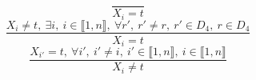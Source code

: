$$\frac{}{X_{i}=t}$$ $$\frac{X_{i} \neq t,~\exists i,~i \in \llbracket1,n\rrbracket,~\forall r',~r' \neq r,~r' \in D_{4},~r \in D_{4}}{X_{i}=t}$$ $$\frac{X_{i'}=t,~\forall i',~i' \neq i,~i' \in \llbracket1,n\rrbracket,~i \in \llbracket1,n\rrbracket}{X_{i} \neq t}$$ 